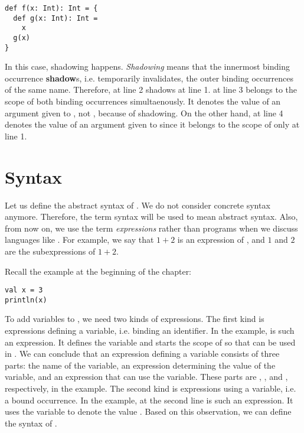 \begin{verbatim}
def f(x: Int): Int = {
  def g(x: Int): Int =
    x
  g(x)
}
\end{verbatim}

In this case, shadowing happens. \textit{Shadowing} means that
the innermost binding occurrence \textbf{shadow}s, i.e. temporarily invalidates,
the outer binding occurrences of the same name. Therefore,  at line 2
shadows  at line 1.
 at line 3 belongs to the scope of both binding occurrences simultaenously.
It denotes the value of an argument given to , not , because of
shadowing. On the other hand,  at line 4 denotes the value of an
argument given to  since it belongs to the scope of only  at
line 1.

\section{Syntax}

Let us define the abstract syntax of \lang. We do not consider concrete
syntax anymore. Therefore, the term syntax will be used to mean abstract
syntax. Also, from now on, we use the term
\textit{expressions} rather than
programs when we discuss languages like \lang. For example, we say that
$1+2$ is an expression of \plang, and $1$ and $2$ are the subexpressions of
$1+2$.

Recall the example at the beginning of the chapter:

\begin{verbatim}
val x = 3
println(x)
\end{verbatim}

To add variables to \plang, we need two kinds of expressions. The first kind is
expressions defining a variable, i.e. binding an identifier. In the example,
 is such an expression. It defines the
variable  and starts the scope of  so that  can be used
in . We can conclude that an expression defining a variable
consists of three parts: the name of the variable, an expression determining the
value of the variable, and an expression that can use the variable. These parts
are , , and , respectively, in the example. The
second kind is expressions using a variable, i.e. a bound occurrence. In the
example,  at the second line is such an expression. It uses the variable  to denote
the value . Based on this observation, we can define the syntax of
\lang.

